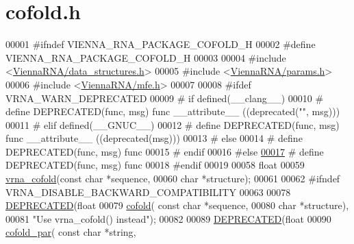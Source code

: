 \hypertarget{cofold_8h_source}{}\section{cofold.\+h}
\label{cofold_8h_source}

\begin{DoxyCode}
00001 \textcolor{preprocessor}{#ifndef VIENNA\_RNA\_PACKAGE\_COFOLD\_H}
00002 \textcolor{preprocessor}{#define VIENNA\_RNA\_PACKAGE\_COFOLD\_H}
00003 
00004 \textcolor{preprocessor}{#include <\mbox{\hyperlink{data__structures_8h}{ViennaRNA/data\_structures.h}}>}
00005 \textcolor{preprocessor}{#include <\mbox{\hyperlink{params_8h}{ViennaRNA/params.h}}>}
00006 \textcolor{preprocessor}{#include <\mbox{\hyperlink{mfe_8h}{ViennaRNA/mfe.h}}>}
00007 
00008 \textcolor{preprocessor}{#ifdef VRNA\_WARN\_DEPRECATED}
00009 \textcolor{preprocessor}{# if defined(\_\_clang\_\_)}
00010 \textcolor{preprocessor}{#  define DEPRECATED(func, msg) func \_\_attribute\_\_ ((deprecated("", msg)))}
00011 \textcolor{preprocessor}{# elif defined(\_\_GNUC\_\_)}
00012 \textcolor{preprocessor}{#  define DEPRECATED(func, msg) func \_\_attribute\_\_ ((deprecated(msg)))}
00013 \textcolor{preprocessor}{# else}
00014 \textcolor{preprocessor}{#  define DEPRECATED(func, msg) func}
00015 \textcolor{preprocessor}{# endif}
00016 \textcolor{preprocessor}{#else}
\mbox{\hyperlink{cofold_8h_aab347a3c03fbe8e7319551b9fa0cce4a}{00017}} \textcolor{preprocessor}{# define DEPRECATED(func, msg) func}
00018 \textcolor{preprocessor}{#endif}
00019 
00058 \textcolor{keywordtype}{float}
00059 \mbox{\hyperlink{group__mfe__cofold_ga9ef3a297201dbf838a8daff2b45c0c82}{vrna\_cofold}}(\textcolor{keyword}{const} \textcolor{keywordtype}{char} *sequence,
00060             \textcolor{keywordtype}{char} *structure);
00061 
00062 \textcolor{preprocessor}{#ifndef VRNA\_DISABLE\_BACKWARD\_COMPATIBILITY}
00063 
00078 \mbox{\hyperlink{cofold_8h_aab347a3c03fbe8e7319551b9fa0cce4a}{DEPRECATED}}(\textcolor{keywordtype}{float}
00079 \mbox{\hyperlink{group__mfe__cofold_gabc8517f22cfe70595ee81fc837910d52}{cofold}}( \textcolor{keyword}{const} \textcolor{keywordtype}{char} *sequence,
00080         \textcolor{keywordtype}{char} *structure),
00081         \textcolor{stringliteral}{"Use vrna\_cofold() instead"});
00082 
00089 \mbox{\hyperlink{cofold_8h_aab347a3c03fbe8e7319551b9fa0cce4a}{DEPRECATED}}(\textcolor{keywordtype}{float}
00090 \mbox{\hyperlink{group__mfe__cofold_ga7612cfeeb1b793f1e4179b1eb53df1f3}{cofold\_par}}( \textcolor{keyword}{const} \textcolor{keywordtype}{char} *\textcolor{keywordtype}{string},

\end{DoxyCode}
